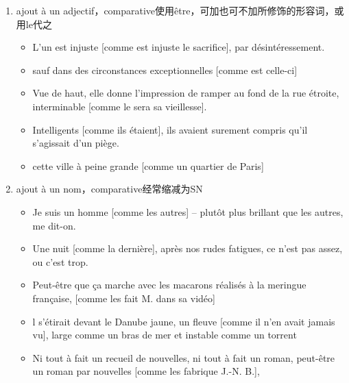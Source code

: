 \documentclass[UTF8]{report}
\begin{document}
\begin{enumerate}
    \item ajout à un adjectif，comparative使用être，可加也可不加所修饰的形容词，或用le代之
    \begin{itemize}
        \item L’un est injuste [comme est injuste le sacrifice], par désintéressement.
        \item sauf dans des circonstances exceptionnelles [comme est celle-ci]
        \item Vue de haut, elle donne l’impression de ramper au fond de la rue étroite, interminable [comme le sera sa vieillesse].
        \item Intelligents [comme ils étaient], ils avaient surement compris qu’il s’agissait d’un piège.
        \item cette ville à peine grande [comme un quartier de Paris]
    \end{itemize}
    \item ajout à un nom，comparative经常缩减为SN
    \begin{itemize}
        \item Je suis un homme [comme les autres] – plutôt plus brillant que les autres, me dit-on.
        \item Une nuit [comme la dernière], après nos rudes fatigues, ce n’est pas assez, ou c’est trop.
        \item Peut-être que ça marche avec les macarons réalisés à la meringue française, [comme les fait M. dans sa vidéo]
        \item l s’étirait devant le Danube jaune, un fleuve [comme il n’en avait jamais vu], large comme un bras de mer et instable comme un torrent
        \item Ni tout à fait un recueil de nouvelles, ni tout à fait un roman, peut-être un roman par nouvelles [comme les fabrique J.-N. B.],
    \end{itemize}
\end{enumerate}
\end{document}
